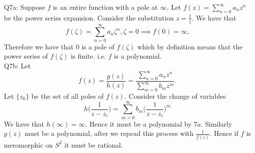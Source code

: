 \documentclass[letterpaper]{article}
\begin{document}
\noindent Q7a: Suppose $f$ is an entire function with a pole at $\infty$. Let $f(z) = \sum_{n=0}^\infty a_n z^n$ be the power series expansion. Consider the substitution $z = \frac{1}{\zeta}. $ We have that $$f( \zeta) = \sum_{n=0}^\infty a_n \zeta^n, \zeta = 0 \implies f(0)= \infty. $$
Therefore we have that $0$ is a pole of $f(\zeta)$ which by definition means that the  power series of $f(\zeta)$ is finite. i.e. $f$ is a polynomial. 
\newline \\ Q7b: Let $$f(z) = \frac{g(z)}{h(z)} = \frac{\sum_{n=0}^\infty a_n z^n }{\sum_{m=0}^\infty b_m z^m}. $$
Let $\{z_k\}$ be the set of all poles of $f(z).$ Consider the change of variables $$h \Big( \frac{1}{z-z_i} \Big) = \sum_{m=0}^\infty b_m \Big( \frac{1}{z-z_i} \Big)^m$$
We have that $h(\infty) = \infty$. Hence it must be a polynomial by $7a$. Similarly $g(z)$ must be a polynomial, after we repead this process with $\frac{1}{f(z)}$. Hence if $f$ is meromorphic on $S^2$ it must be rational. 
\end{document}
